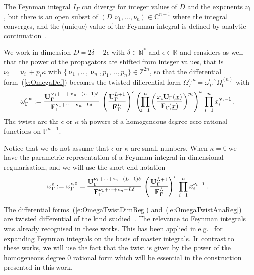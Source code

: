\documentclass[a4paper,12pt]{article}
\numberwithin{equation}{section}
\numberwithin{figure}{section}
\begin{document}
The Feynman integral $I_\Gamma$ can diverge  for integer values of $D$ and 
the exponents $\nu_i$, but there is an open subset of
$(D,\nu_1,\dots,\nu_n)\in\mathbb C^{n+1}$ where  the integral
converges,  and the (unique) value of the Feynman integral is  defined by analytic continuation~\cite{Speer}.


We work in dimension $D=2\delta-2\epsilon$ with $\delta\in\mathbb N^*$ and
$\epsilon\in\mathbb R$ and  considers as well that the power of the propagators are shifted from integer values, that is  $\nu_i=\upnu_i
+ p_i \kappa$ with $\{\upnu_1,\dots,\upnu_n,p_1,\dots,p_n\}\in\mathbb Z^{2n}$, so that the 
differential form~(\ref{e:OmegaDef}) becomes the twisted
differential form $\Omega^{\epsilon,\kappa}_\Gamma
=\omega^{\epsilon,\kappa}_\Gamma \Omega_0^{(n)}$ with
\begin{equation}\label{e:OmegaTwistAnaReg}
	\omega^{\epsilon,\kappa}_\Gamma := { \textbf{U}_\Gamma
		^{\upnu_1+\cdots+\upnu_n-(L+1)\delta}  \over \textbf{F}_\Gamma
		^{\upnu_1+\cdots+\upnu_n-L\delta}
	}\,\left(\textbf{U}_\Gamma^{L+1}\over \textbf{F}_\Gamma^L\right)^\epsilon
	\left(\prod_{i=1}^n \left(x_i \textbf{U}_\Gamma(\underline x)\over
	\textbf{F}_\Gamma(\underline x)\right)^{p_i}\right)^{\kappa} \, \prod_{i=1}^n x_i^{\upnu_i-1} \,.
\end{equation}
%
The twists are the $\epsilon$ or $\kappa$-th powers of a homogeneous
degree zero rational functions on $\mathbb
P^{n-1}$.


Notice that we do not assume that $\epsilon$ or $\kappa$ are small numbers.
When $\kappa=0$ we have the parametric representation of a Feynman
integral in dimensional regularisation, and we will use the short end
notation 
\begin{equation}\label{e:OmegaTwistDimReg}
\omega^\epsilon_\Gamma:=\omega^{\epsilon,0}_\Gamma = { \textbf{U}_\Gamma ^{\nu_1+\cdots+\nu_n-(L+1)\delta}  \over \textbf{F}_\Gamma ^{\nu_1+\cdots+\nu_n-L\delta} }\,
	\left(\textbf{U}_\Gamma^{L+1}\over \textbf{F}_\Gamma^{L}\right)^{\epsilon} \, \prod_{i=1}^n x_i^{\nu_i-1} \, .
\end{equation}
%

\medskip

The differential forms~(\ref{e:OmegaTwistDimReg})
and~(\ref{e:OmegaTwistAnaReg}) are twisted differential of the kind
studied~\cite{Aomoto1,Aomoto,Aomoto_1982,AomotoBook}.
The relevance to Feynman integrals was already recognised in these works. 
This has been applied in
e.g.~\cite{Mizera:2017rqa,Frellesvig:2019uqt,Cacciatori:2021nli,Munch:2023ifm,Brunello:2023rpq,Teschke:2024bct}  for
expanding Feynman integrals on the basis of master integrals. In contrast to these works, 
%
we will use
the fact that the twist is given by
the power of the homogeneous degree 0 rational form
which will be essential
in the construction presented in this work.
\end{document}

